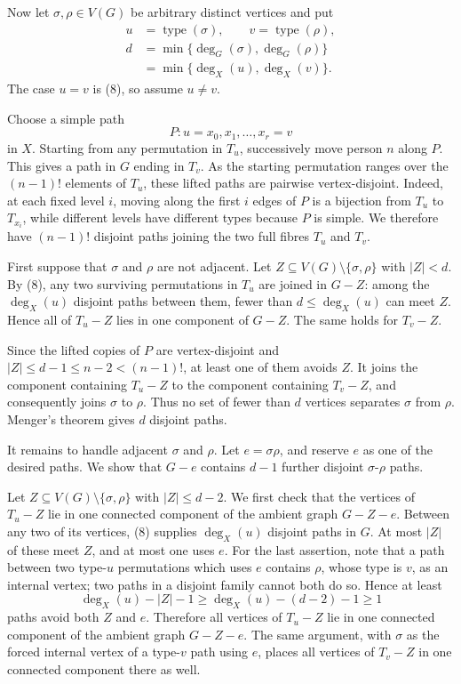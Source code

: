 \documentclass[11pt]{article}
\begin{document}
Now let \(\sigma,\rho\in V(G)\) be arbitrary distinct vertices and put
\[
\begin{aligned}
u&=\operatorname{type}(\sigma),\qquad v=\operatorname{type}(\rho),\\
d&=\min\{\deg_G(\sigma),\deg_G(\rho)\}\\
 &=\min\{\deg_X(u),\deg_X(v)\}.
\end{aligned}\tag{9}
\]
The case \(u=v\) is (8), so assume \(u\neq v\).

Choose a simple path
\[
P:u=x_0,x_1,\ldots,x_r=v
\]
in \(X\). Starting from any permutation in \(T_u\), successively move person \(n\) along \(P\). This gives a path in \(G\) ending in \(T_v\). As the starting permutation ranges over the \((n-1)!\) elements of \(T_u\), these lifted paths are pairwise vertex-disjoint. Indeed, at each fixed level \(i\), moving along the first \(i\) edges of \(P\) is a bijection from \(T_u\) to \(T_{x_i}\), while different levels have different types because \(P\) is simple. We therefore have \((n-1)!\) disjoint paths joining the two full fibres \(T_u\) and \(T_v\).

First suppose that \(\sigma\) and \(\rho\) are not adjacent. Let \(Z\subseteq V(G)\setminus\{\sigma,\rho\}\) with \(|Z|<d\). By (8), any two surviving permutations in \(T_u\) are joined in \(G-Z\): among the \(\deg_X(u)\) disjoint paths between them, fewer than \(d\leq\deg_X(u)\) can meet \(Z\). Hence all of \(T_u-Z\) lies in one component of \(G-Z\). The same holds for \(T_v-Z\).

Since the lifted copies of \(P\) are vertex-disjoint and \(|Z|\leq d-1\leq n-2<(n-1)!\), at least one of them avoids \(Z\). It joins the component containing \(T_u-Z\) to the component containing \(T_v-Z\), and consequently joins \(\sigma\) to \(\rho\). Thus no set of fewer than \(d\) vertices separates \(\sigma\) from \(\rho\). Menger's theorem gives \(d\) disjoint paths.

It remains to handle adjacent \(\sigma\) and \(\rho\). Let \(e=\sigma\rho\), and reserve \(e\) as one of the desired paths. We show that \(G-e\) contains \(d-1\) further disjoint \(\sigma\)-\(\rho\) paths.

Let \(Z\subseteq V(G)\setminus\{\sigma,\rho\}\) with \(|Z|\leq d-2\). We first check that the vertices of \(T_u-Z\) lie in one connected component of the ambient graph \(G-Z-e\). Between any two of its vertices, (8) supplies \(\deg_X(u)\) disjoint paths in \(G\). At most \(|Z|\) of these meet \(Z\), and at most one uses \(e\). For the last assertion, note that a path between two type-\(u\) permutations which uses \(e\) contains \(\rho\), whose type is \(v\), as an internal vertex; two paths in a disjoint family cannot both do so. Hence at least
\[
\deg_X(u)-|Z|-1\geq \deg_X(u)-(d-2)-1\geq1
\]
paths avoid both \(Z\) and \(e\). Therefore all vertices of \(T_u-Z\) lie in one connected component of the ambient graph \(G-Z-e\). The same argument, with \(\sigma\) as the forced internal vertex of a type-\(v\) path using \(e\), places all vertices of \(T_v-Z\) in one connected component there as well.
\end{document}
